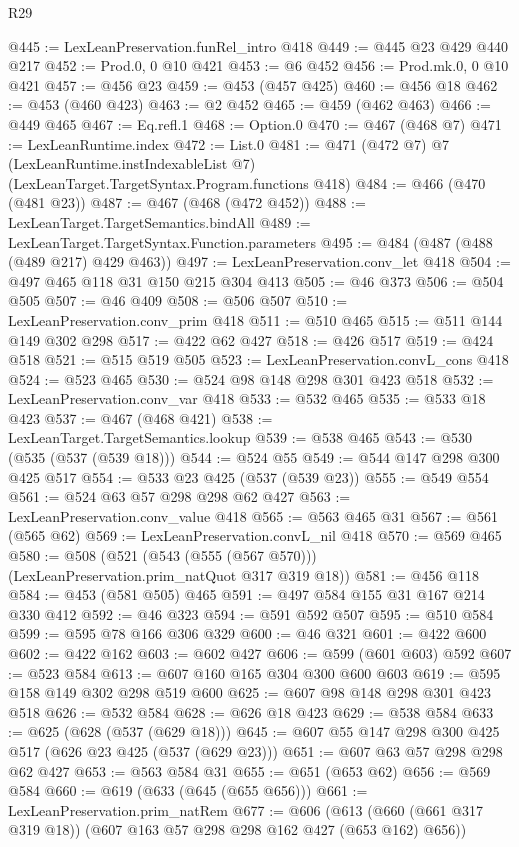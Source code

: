\begin{lexlean}{R29}
\begin{coremodule}
@445 := LexLeanPreservation.funRel_intro @418
@449 := @445 @23 @429 @440 @217
@452 := Prod.{0, 0} @10 @421
@453 := @6 @452
@456 := Prod.mk.{0, 0} @10 @421
@457 := @456 @23
@459 := @453 (@457 @425)
@460 := @456 @18
@462 := @453 (@460 @423)
@463 := @2 @452
@465 := @459 (@462 @463)
@466 := @449 @465
@467 := Eq.refl.{1}
@468 := Option.{0}
@470 := @467 (@468 @7)
@471 := LexLeanRuntime.index
@472 := List.{0}
@481 := @471
    (@472 @7)
    @7
    (LexLeanRuntime.instIndexableList @7)
    (LexLeanTarget.TargetSyntax.Program.functions @418)
@484 := @466 (@470 (@481 @23))
@487 := @467 (@468 (@472 @452))
@488 := LexLeanTarget.TargetSemantics.bindAll
@489 := LexLeanTarget.TargetSyntax.Function.parameters
@495 := @484 (@487 (@488 (@489 @217) @429 @463))
@497 := LexLeanPreservation.conv_let @418
@504 := @497 @465 @118 @31 @150 @215 @304 @413
@505 := @46 @373
@506 := @504 @505
@507 := @46 @409
@508 := @506 @507
@510 := LexLeanPreservation.conv_prim @418
@511 := @510 @465
@515 := @511 @144 @149 @302 @298
@517 := @422 @62 @427
@518 := @426 @517
@519 := @424 @518
@521 := @515 @519 @505
@523 := LexLeanPreservation.convL_cons @418
@524 := @523 @465
@530 := @524 @98 @148 @298 @301 @423 @518
@532 := LexLeanPreservation.conv_var @418
@533 := @532 @465
@535 := @533 @18 @423
@537 := @467 (@468 @421)
@538 := LexLeanTarget.TargetSemantics.lookup
@539 := @538 @465
@543 := @530 (@535 (@537 (@539 @18)))
@544 := @524 @55
@549 := @544 @147 @298 @300 @425 @517
@554 := @533 @23 @425 (@537 (@539 @23))
@555 := @549 @554
@561 := @524 @63 @57 @298 @298 @62 @427
@563 := LexLeanPreservation.conv_value @418
@565 := @563 @465 @31
@567 := @561 (@565 @62)
@569 := LexLeanPreservation.convL_nil @418
@570 := @569 @465
@580 := @508 (@521 (@543 (@555 (@567 @570))) (LexLeanPreservation.prim_natQuot @317 @319 @18))
@581 := @456 @118
@584 := @453 (@581 @505) @465
@591 := @497 @584 @155 @31 @167 @214 @330 @412
@592 := @46 @323
@594 := @591 @592 @507
@595 := @510 @584
@599 := @595 @78 @166 @306 @329
@600 := @46 @321
@601 := @422 @600
@602 := @422 @162
@603 := @602 @427
@606 := @599 (@601 @603) @592
@607 := @523 @584
@613 := @607 @160 @165 @304 @300 @600 @603
@619 := @595 @158 @149 @302 @298 @519 @600
@625 := @607 @98 @148 @298 @301 @423 @518
@626 := @532 @584
@628 := @626 @18 @423
@629 := @538 @584
@633 := @625 (@628 (@537 (@629 @18)))
@645 := @607 @55 @147 @298 @300 @425 @517 (@626 @23 @425 (@537 (@629 @23)))
@651 := @607 @63 @57 @298 @298 @62 @427
@653 := @563 @584 @31
@655 := @651 (@653 @62)
@656 := @569 @584
@660 := @619 (@633 (@645 (@655 @656)))
@661 := LexLeanPreservation.prim_natRem
@677 := @606 (@613 (@660 (@661 @317 @319 @18)) (@607 @163 @57 @298 @298 @162 @427 (@653 @162) @656))

\end{coremodule}
\end{lexlean}
